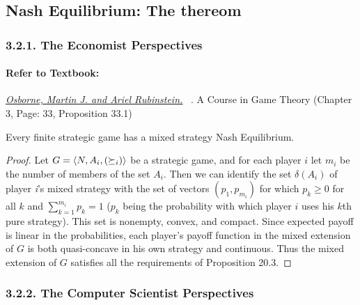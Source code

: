 \documentclass[runningheads]{llncs}
\begin{document}
\subsection{Nash Equilibrium: The thereom}
\subsubsection{3.2.1. The Economist Perspectives}
\paragraph{Refer to Textbook:} 
\href{https://www.sciencedirect.com/science/article/pii/S0899825699907236}{\textit{\underline{Osborne, Martin J. and Ariel Rubinstein.}}}~
\citeyear{osborne1994course}. A Course in Game Theory (Chapter 3, Page: 33, Proposition 33.1)
\begin{proposition}
Every finite strategic game has a mixed strategy Nash Equilibrium.
\end{proposition}
\begin{proof}
Let $G=\langle\mathnormal{N}, \mathnormal{A_{i}},(\succeq_{i})\rangle$ be a strategic game, and for each player $i$ let $m_{i}$ be the number of members of the set $A_{i}$. Then we can identify the set $\delta(A_{i})$ of player \textit{i}'s mixed strategy with the set of vectors $(p_{1},p_{m_{i}})$ for which $p_{k} \geq 0 $ for all $k$ and $\sum_{k=1}^{m_i}p_{k}=1$ ($p_{k}$ being the probability with which player $i$ uses his $k$th pure strategy). This set is nonempty, convex, and compact. Since expected payoff is linear in the probabilities, each player's payoff function in the mixed extension of $G$ is both quasi-concave in his own strategy and continuous. Thus the mixed extension of $G$ satisfies all the requirements of Proposition 20.3.
 \end{proof}


\subsubsection{3.2.2. The Computer Scientist Perspectives}
\end{document}
